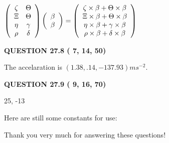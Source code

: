 \documentclass[12pt]{article}
\begin{document}
$  %
 \left( \begin{array}
 {
 c
 c
 }
                    \zeta & 
 \Theta \\ 
                    \Xi & 
 \Theta \\ 
 \eta & 
 \gamma \\ 
 \rho & 
 \delta
 \end{array} \right)
 \left( \begin{array}
 {
 c
 }
 \beta \\ 
 \beta
 \end{array} \right)
=
  \left( \begin{array}
 {
 c
 }
                    \zeta \times  \beta   +  \Theta \times  \beta \\ 
                    \Xi \times  \beta   +  \Theta \times  \beta \\ 
 \eta \times  \beta   +  \gamma \times  \beta \\ 
 \rho \times  \beta   +  \delta \times  \beta
 \end{array} \right)
$
 
 
 
  
\vspace{0.2in}
  
{\textbf{\Large{QUESTION
27.8 
 (          7,         14,         50)
}}}
  
  
 
 
\noindent{}
 
 
  The accelaration is $  %
(
1.38,
.14,
-137.93)
ms^{-2} $.
 
 
 
 
  
\vspace{0.2in}
  
{\textbf{\Large{QUESTION
27.9 
 (          9,         16,         70)
}}}
  
  


 
 
\noindent{}

25,  %
-13
 
 
 
   
   
 \vspace{0.2in}
Here are still some constants for use:
 
 
 
 
Thank you very much for answering these questions!
 
\end{document}
